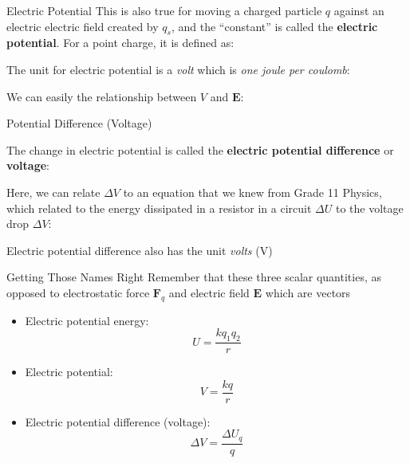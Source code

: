 \documentclass[12pt,aspectratio=169]{beamer}
\begin{document}
\begin{frame}{Electric Potential}
  This is also true for moving a charged particle $q$ against an electric
  electric field created by $q_s$, and the ``constant'' is called the
  \textbf{electric potential}. For a point charge, it is defined as:


  The unit for electric potential is a \emph{volt} which is
  \emph{one joule per coulomb}:


  \vspace{-.2in}We can easily the relationship between $V$ and $\bm{E}$:
  
\end{frame}



\begin{frame}{Potential Difference (Voltage)}

  The change in electric potential is called the
  \textbf{electric potential difference} or \textbf{voltage}:


  Here, we can relate $\Delta V$ to an equation that we knew from Grade 11
  Physics, which related to the energy dissipated in a resistor in a circuit
  $\Delta U$ to the voltage drop $\Delta V$:
    

  Electric potential difference also has the unit \emph{volts} (\si{\volt})
\end{frame}



\begin{frame}{Getting Those Names Right}
  Remember that these three scalar quantities, as opposed to electrostatic
  force $\bm{F}_q$ and electric field $\bm{E}$ which are vectors
  \begin{itemize}
  \item Electric potential energy:
    \begin{displaymath}
      U=\frac{kq_1q_2}{r}
    \end{displaymath}
  \item Electric potential:
    \begin{displaymath}
      V=\frac{kq}{r}
    \end{displaymath}
  \item Electric potential difference (voltage):
    \begin{displaymath}
      \Delta V=\frac{\Delta U_q}{q}
    \end{displaymath}
  \end{itemize}
\end{frame}
\end{document}

